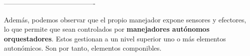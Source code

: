 ----------------------------------------

Además, podemos observar que el propio manejador expone sensores y efectores, lo que permite que sean controlados por \textbf{manejadores autónomos orquestadores}. Estos gestionan a un nivel superior uno o más elementos autonómicos. Son por tanto, elementos componibles.
